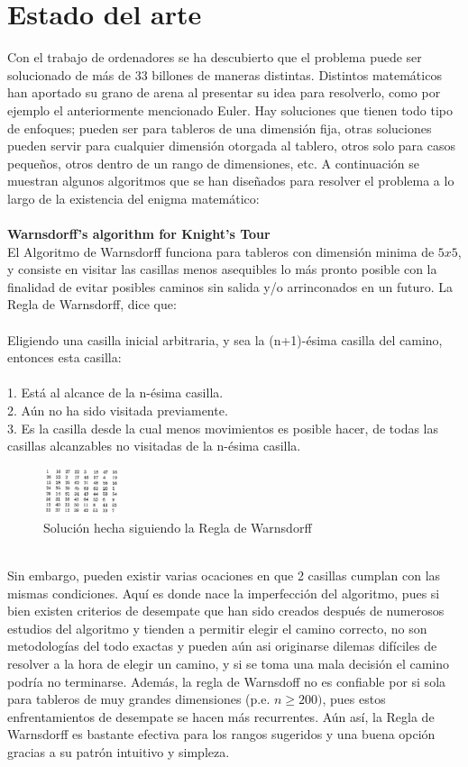 \documentclass[journal, 10pt]{IEEEtran}
\begin{document}
\section{Estado del arte}
Con el trabajo de ordenadores se ha descubierto que el problema puede ser solucionado de más de 33 billones de maneras distintas. Distintos matemáticos han aportado su grano de arena al presentar su idea para resolverlo, como por ejemplo el anteriormente mencionado Euler. Hay soluciones que tienen todo tipo de enfoques; pueden ser para tableros de una dimensión fija, otras soluciones pueden servir para cualquier dimensión otorgada al tablero, otros solo para casos pequeños, otros dentro de un rango de dimensiones, etc. A continuación se muestran algunos algoritmos que se han diseñados para resolver el problema a lo largo de la existencia del enigma matemático:\\
\\\textbf{Warnsdorff’s algorithm for Knight’s Tour}\\
El Algoritmo de Warnsdorff funciona para tableros con dimensión minima de $5x5$, y consiste en visitar las casillas menos asequibles lo más pronto posible con la finalidad de evitar posibles caminos sin salida y/o arrinconados en un futuro. La Regla de Warnsdorff\cite{Squirrel:1996}, dice que:\\
\\Eligiendo una casilla inicial arbitraria, y sea la (n+1)-ésima casilla del camino, entonces esta casilla:\\
\\1. Está al alcance de la n-ésima casilla.\\
2. Aún no ha sido visitada previamente.\\
3. Es la casilla desde la cual menos movimientos es posible hacer, de todas las casillas alcanzables no visitadas de la n-ésima casilla.\\
\begin{figure}[h]
\centering
\includegraphics[width=0.2\textwidth]{figures/warnsdorff.png}
\caption{Soluci\'on hecha siguiendo la Regla de Warnsdorff}
\label{fig:euler}
\end{figure}
\\Sin embargo, pueden existir varias ocaciones en que 2 casillas cumplan con las mismas condiciones. Aquí es donde nace la imperfección del algoritmo, pues si bien existen criterios de desempate que han sido creados después de numerosos estudios del algoritmo y tienden a permitir elegir el camino correcto, no son metodologías del todo exactas y pueden aún asi originarse dilemas difíciles de resolver a la hora de elegir un camino, y si se toma una mala decisión el camino podría no terminarse. Además, la regla de Warnsdoff no es confiable por si sola para tableros de muy grandes dimensiones (p.e. $n \geq 200)$, pues estos enfrentamientos de desempate se hacen más recurrentes. Aún así, la Regla de Warnsdorff es bastante efectiva para los rangos sugeridos y una buena opción gracias a su patrón intuitivo y simpleza.   
\end{document}
